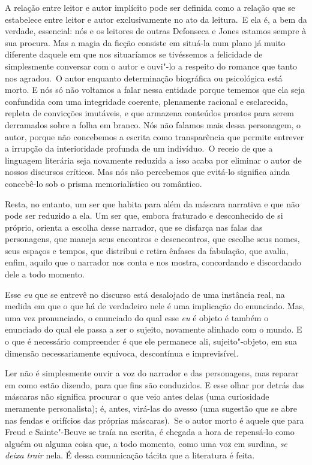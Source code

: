 A relação entre leitor e autor implícito pode ser definida como a
relação que se estabelece entre leitor e autor exclusivamente no ato da
leitura.~E ela é, a bem da verdade, essencial: nós e os leitores de
outras Defonseca e Jones estamos sempre à sua procura. Mas a magia da
ficção consiste em situá-la num plano já muito diferente daquele em que
nos situaríamos se tivéssemos a felicidade de simplesmente conversar com
o autor e ouvi"-lo a respeito do romance que tanto nos agradou.~O autor
enquanto determinação biográfica ou psicológica está morto. E nós só não
voltamos a falar nessa entidade porque tememos que ela seja confundida
com uma integridade coerente, plenamente racional e esclarecida, repleta
de convicções imutáveis, e que armazena conteúdos prontos para serem
derramados sobre a folha em branco. Nós não falamos mais dessa
personagem, o autor, porque não concebemos a escrita como transparência
que permite entrever a irrupção da interioridade profunda de um
indivíduo.~O receio de que a linguagem literária seja novamente reduzida
a isso acaba por eliminar o autor de nossos discursos críticos. Mas nós
não percebemos que evitá-lo significa ainda concebê-lo sob o prisma
memorialístico ou romântico.

Resta, no entanto, um ser que habita para além da máscara narrativa e
que não pode ser reduzido a ela. Um ser que, embora fraturado e
desconhecido de si próprio, orienta a escolha desse narrador, que se
disfarça nas falas das personagens, que maneja seus encontros e
desencontros, que escolhe seus nomes, seus espaços e tempos, que
distribui e retira ênfases da fabulação, que avalia, enfim, aquilo que o
narrador nos conta e nos mostra, concordando e discordando dele a todo
momento.

Esse \emph{eu} que se entrevê no discurso está desalojado de uma
instância real, na medida em que o que há de verdadeiro nele é uma
implicação do enunciado. Mas, uma vez pronunciado, o enunciado do qual
esse \emph{eu} é objeto é também o enunciado do qual ele passa a ser o
sujeito, novamente alinhado com o mundo. E o que é necessário
compreender é que ele permanece ali, sujeito"-objeto, em sua dimensão
necessariamente equívoca, descontínua e imprevisível.

Ler não é simplesmente ouvir a voz do narrador e das personagens, mas
reparar em como estão dizendo, para que fins são conduzidos. E esse
olhar por detrás das máscaras não significa procurar o que veio antes
delas (uma curiosidade meramente personalista); é, antes, virá-las do
avesso (uma sugestão que se abre nas fendas e orifícios das próprias
máscaras).~Se o autor morto é aquele que para Freud e Sainte"-Beuve se traía na escrita, é chegada a hora de repensá-lo como alguém ou alguma
coisa que, a todo momento, como uma voz em surdina, \emph{se deixa trair} nela. É dessa comunicação tácita que a literatura é feita.

